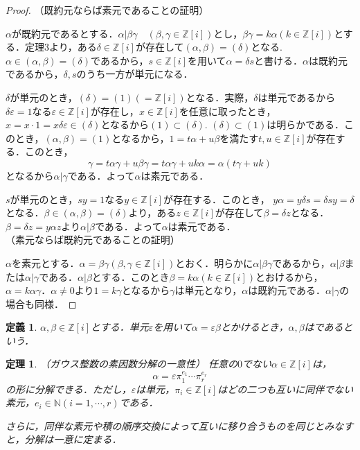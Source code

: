 \documentclass[dvipdfmx]{jsarticle}
\newtheorem{theorem}{定理}
\newtheorem{defnition}{定義}
\begin{document}
\begin{proof}

（既約元ならば素元であることの証明）

$\alpha$が既約元であるとする．$\alpha|\beta\gamma\quad(\beta,\gamma\in\mathbb{Z}[i])$とし，$\beta\gamma=k\alpha(k\in\mathbb{Z}[i])$とする．定理3より，ある$\delta\in\mathbb{Z}[i]$が存在して$(\alpha,\beta)=(\delta)$となる.
$\alpha\in(\alpha,\beta)=(\delta)$であるから，$s\in\mathbb{Z}[i]$を用いて$\alpha=\delta s$と書ける．$\alpha$は既約元であるから，$\delta,s$のうち一方が単元になる．

$\delta$が単元のとき，$(\delta)=(1)(=\mathbb{Z}[i])$となる．実際，$\delta$は単元であるから$\delta\varepsilon=1$なる$\varepsilon\in\mathbb{Z}[i]$が存在し，$x\in\mathbb{Z}[i]$を任意に取ったとき，$x=x\cdot1=x\delta\varepsilon\in(\delta)$となるから$(1)\subset(\delta)$.
$(\delta)\subset(1)$は明らかである．このとき，$(\alpha,\beta)=(1)$となるから，$1=t\alpha+u\beta$を満たす$t,u\in\mathbb{Z}[i]$が存在する．このとき，$$\gamma=t\alpha\gamma+u\beta\gamma=t\alpha\gamma+uk\alpha=\alpha(t\gamma+uk)$$
となるから$\alpha|\gamma$である．よって$\alpha$は素元である．

$s$が単元のとき，$sy=1$なる$y\in\mathbb{Z}[i]$が存在する．このとき，
$y\alpha=y\delta s=\delta sy=\delta$となる．$\beta\in(\alpha,\beta)=(\delta)$より，ある$z\in\mathbb{Z}[i]$が存在して$\beta=\delta z$となる．$\beta=\delta z=y\alpha z$より$\alpha|\beta$である．よって$\alpha$は素元である．\\



（素元ならば既約元であることの証明）

$\alpha$を素元とする．$\alpha=\beta\gamma(\beta,\gamma\in\mathbb{Z}[i])$とおく．明らかに$\alpha|\beta\gamma$であるから，$\alpha|\beta$または$\alpha|\gamma$である．$\alpha|\beta$とする．このとき$\beta=k\alpha(k\in\mathbb{Z}[i])$とおけるから，
$\alpha=k\alpha\gamma$．$\alpha\neq0$より$1=k\gamma$となるから$\gamma$は単元となり，$\alpha$は既約元である．$\alpha|\gamma$の場合も同様．
\end{proof}

\begin{defnition}

$\alpha,\beta\in\mathbb{Z}[i]$とする．単元$\varepsilon$を用いて$\alpha=\varepsilon\beta$とかけるとき，$\alpha,\beta$はであるという．
\end{defnition}

\begin{theorem}{（ガウス整数の素因数分解の一意性）}
任意の$0$でない$\alpha\in\mathbb{Z}[i]$は，
$$\alpha=\varepsilon\pi_1^{e_1}\cdots\pi_r^{e_r}$$
の形に分解できる．ただし，$\varepsilon$は単元，$\pi_i\in\mathbb{Z}[i]$はどの二つも互いに同伴でない素元，$e_i\in\mathbb{N}(i=1,\cdots, r)$である．

さらに，同伴な素元や積の順序交換によって互いに移り合うものを同じとみなすと，分解は一意に定まる．
\end{theorem}
\end{document}
